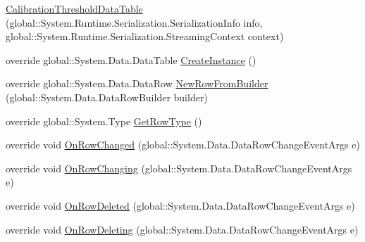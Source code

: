 \begin{DoxyCompactItemize}
\item 
\hyperlink{class_env_int_1_1_win32_1_1_field_tech_1_1_manager_1_1_data_sets_1_1_guide_ware_mobile_data_set_e4a98fb4b531becb042ae997c9d8a15c_a51a25c8d58a1b95b08b945fc3c6a77e7}{Calibration\+Threshold\+Data\+Table} (global\+::\+System.\+Runtime.\+Serialization.\+Serialization\+Info info, global\+::\+System.\+Runtime.\+Serialization.\+Streaming\+Context context)
\item 
override global\+::\+System.\+Data.\+Data\+Table \hyperlink{class_env_int_1_1_win32_1_1_field_tech_1_1_manager_1_1_data_sets_1_1_guide_ware_mobile_data_set_e4a98fb4b531becb042ae997c9d8a15c_ad1a69ac93bebcec5da577e24144250fe}{Create\+Instance} ()
\item 
override global\+::\+System.\+Data.\+Data\+Row \hyperlink{class_env_int_1_1_win32_1_1_field_tech_1_1_manager_1_1_data_sets_1_1_guide_ware_mobile_data_set_e4a98fb4b531becb042ae997c9d8a15c_a2b0773a63c112af4f9f081057e34ff7b}{New\+Row\+From\+Builder} (global\+::\+System.\+Data.\+Data\+Row\+Builder builder)
\item 
override global\+::\+System.\+Type \hyperlink{class_env_int_1_1_win32_1_1_field_tech_1_1_manager_1_1_data_sets_1_1_guide_ware_mobile_data_set_e4a98fb4b531becb042ae997c9d8a15c_ac55220449c0650049bdcd259fda915f1}{Get\+Row\+Type} ()
\item 
override void \hyperlink{class_env_int_1_1_win32_1_1_field_tech_1_1_manager_1_1_data_sets_1_1_guide_ware_mobile_data_set_e4a98fb4b531becb042ae997c9d8a15c_ac7dffce7242d2a411d9b45d87798a3fd}{On\+Row\+Changed} (global\+::\+System.\+Data.\+Data\+Row\+Change\+Event\+Args e)
\item 
override void \hyperlink{class_env_int_1_1_win32_1_1_field_tech_1_1_manager_1_1_data_sets_1_1_guide_ware_mobile_data_set_e4a98fb4b531becb042ae997c9d8a15c_a618ee2560dec8d7ce0c0b6fd8fd9d32e}{On\+Row\+Changing} (global\+::\+System.\+Data.\+Data\+Row\+Change\+Event\+Args e)
\item 
override void \hyperlink{class_env_int_1_1_win32_1_1_field_tech_1_1_manager_1_1_data_sets_1_1_guide_ware_mobile_data_set_e4a98fb4b531becb042ae997c9d8a15c_a65a47d9c51ded5bb5defeb018fee13ca}{On\+Row\+Deleted} (global\+::\+System.\+Data.\+Data\+Row\+Change\+Event\+Args e)
\item 
override void \hyperlink{class_env_int_1_1_win32_1_1_field_tech_1_1_manager_1_1_data_sets_1_1_guide_ware_mobile_data_set_e4a98fb4b531becb042ae997c9d8a15c_a88018397e967fc9a220293bbd434fafb}{On\+Row\+Deleting} (global\+::\+System.\+Data.\+Data\+Row\+Change\+Event\+Args e)
\item 

\end{DoxyCompactItemize}
